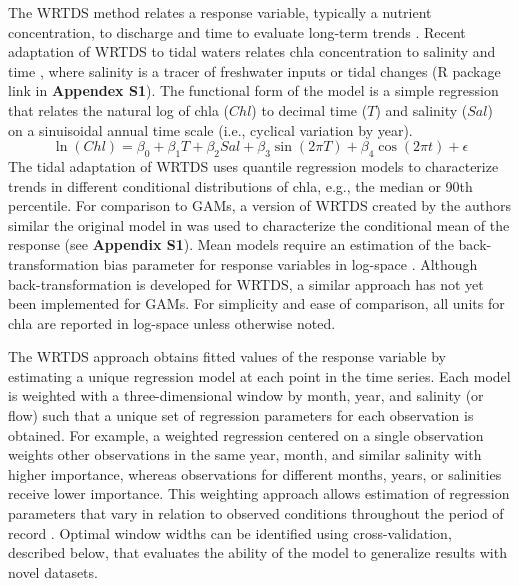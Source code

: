 \documentclass{svjour3}\usepackage[]{graphicx}\usepackage[]{color}
\begin{document}
The \ac{WRTDS} method relates a response variable, typically a nutrient concentration, to discharge and time to evaluate long-term trends \cite{Hirsch10,Hirsch14}. Recent adaptation of \ac{WRTDS} to tidal waters relates \ac{chla} concentration to salinity and time \cite{Beck15}, where salinity is a tracer of freshwater inputs or tidal changes (R package link in {\bf Appendex S1}).  The functional form of the model is a simple regression that relates the natural log of \ac{chla} ($Chl$) to decimal time ($T$) and salinity ($Sal$) on a sinuisoidal annual time scale (i.e., cyclical variation by year). 
\begin{equation} \label{eqn:funform}
\ln\left(Chl\right) = \beta_0 + \beta_1 T + \beta_2 Sal + \beta_3 \sin\left(2\pi T\right) + \beta_4 \cos\left(2\pi t\right) + \epsilon
\end{equation}
The tidal adaptation of \ac{WRTDS} uses quantile regression models \cite{Cade03} to characterize trends in different conditional distributions of \ac{chla}, e.g., the median or 90th percentile. For comparison to \acp{GAM}, a version of \ac{WRTDS} created by the authors similar the original model in \cite{Hirsch10} was used to characterize the conditional mean of the response (see {\bf Appendix S1}).  Mean models require an estimation of the back-transformation bias parameter for response variables in log-space \cite{Hirsch10}.  Although back-transformation is developed for \ac{WRTDS}, a similar approach has not yet been implemented for \acp{GAM}.  For simplicity and ease of comparison, all units for \ac{chla} are reported in log-space unless otherwise noted.

The \ac{WRTDS} approach obtains fitted values of the response variable by estimating a unique regression model at each point in the time series. Each model is weighted with a three-dimensional window by month, year, and salinity (or flow) such that a unique set of regression parameters for each observation is obtained. For example, a weighted regression centered on a single observation weights other observations in the same year, month, and similar salinity with higher importance, whereas observations for different months, years, or salinities receive lower importance. This weighting approach allows estimation of regression parameters that vary in relation to observed conditions throughout the period of record \cite{Hirsch10}. Optimal window widths can be identified using cross-validation, described below, that evaluates the ability of the model to generalize results with novel datasets.
\end{document}
